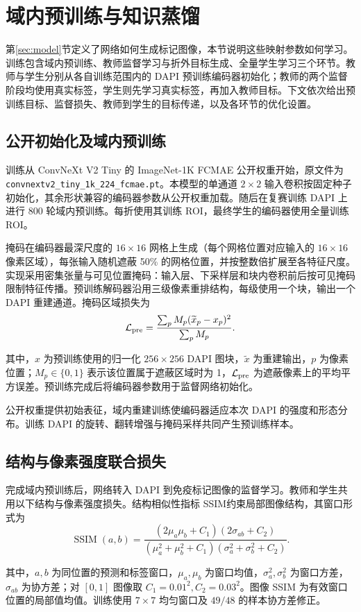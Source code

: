 \documentclass[UTF8,a4paper,zihao=5,fontset=fandol]{ctexart}
\newcommand{\op}[1]{\operatorname{#1}}
\newcommand{\sym}[1]{\par\nobreak\noindent\begin{minipage}{\linewidth}#1\end{minipage}\par}
\begin{document}
\FloatBarrier
\section{域内预训练与知识蒸馏}\label{sec:training}
第\ref{sec:model}节定义了网络如何生成标记图像，本节说明这些映射参数如何学习。训练包含域内预训练、教师监督学习与折外目标生成、全量学生学习三个环节。教师与学生分别从各自训练范围内的 DAPI 预训练编码器初始化；教师的两个监督阶段均使用真实标签，学生则先学习真实标签，再加入教师目标。下文依次给出预训练目标、监督损失、教师到学生的目标传递，以及各环节的优化设置。
\subsection{公开初始化及域内预训练}
训练从 ConvNeXt V2 Tiny 的 ImageNet-1K FCMAE 公开权重开始\cite{convnext}，原文件为 \nolinkurl{convnextv2_tiny_1k_224_fcmae.pt}。本模型的单通道 $2\times2$ 输入卷积按固定种子初始化，其余形状兼容的编码器参数从公开权重加载。随后在复赛训练 DAPI 上进行 800 轮域内预训练。每折使用其训练 ROI，最终学生的编码器使用全量训练 ROI。

掩码在编码器最深尺度的 $16\times16$ 网格上生成（每个网格位置对应输入的 $16\times16$ 像素区域），每张输入随机遮蔽 50\% 的网格位置，并按整数倍扩展至各特征尺度。实现采用密集张量与可见位置掩码：输入层、下采样层和块内卷积前后按可见掩码限制特征传播。预训练解码器沿用三级像素重排结构，每级使用一个块，输出一个 DAPI 重建通道。掩码区域损失为
\begin{equation}
\mathcal L_{\rm pre}=\frac{\sum_p M_p(\widetilde x_p-x_p)^2}
{\sum_p M_p}.
\label{eq:pretrain}
\end{equation}
\sym{其中，$x$ 为预训练使用的归一化 $256\times256$ DAPI 图块，$\widetilde x$ 为重建输出，$p$ 为像素位置；$M_p\in\{0,1\}$ 表示该位置属于遮蔽区域时为 1，$\mathcal L_{\rm pre}$ 为遮蔽像素上的平均平方误差。预训练完成后将编码器参数用于监督网络初始化。}
公开权重提供初始表征，域内重建训练使编码器适应本次 DAPI 的强度和形态分布。训练 DAPI 的旋转、翻转增强与掩码采样共同产生预训练样本。

\subsection{结构与像素强度联合损失}
完成域内预训练后，网络转入 DAPI 到免疫标记图像的监督学习。教师和学生共用以下结构与像素强度损失。结构相似性指标 SSIM\cite{ssim}约束局部图像结构，其窗口形式为
\begin{equation}
\op{SSIM}(a,b)=
\frac{(2\mu_a\mu_b+C_1)(2\sigma_{ab}+C_2)}
{(\mu_a^2+\mu_b^2+C_1)(\sigma_a^2+\sigma_b^2+C_2)}.
\label{eq:ssim}
\end{equation}
\sym{其中，$a,b$ 为同位置的预测和标签窗口，$\mu_a,\mu_b$ 为窗口均值，$\sigma_a^2,\sigma_b^2$ 为窗口方差，$\sigma_{ab}$ 为协方差；对 $[0,1]$ 图像取 $C_1=0.01^2,C_2=0.03^2$。图像 SSIM 为有效窗口位置的局部值均值。训练使用 $7\times7$ 均匀窗口及 $49/48$ 的样本协方差修正。}
\end{document}
